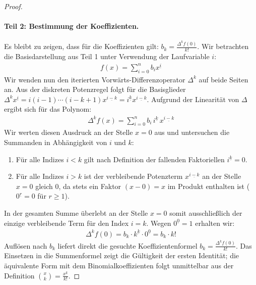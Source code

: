 \documentclass{article}
\theoremstyle{definition}
\begin{document}
\begin{proof}
\paragraph{Teil 2: Bestimmung der Koeffizienten.}
Es bleibt zu zeigen, dass für die Koeffizienten gilt: $b_k = \frac{\Delta^k f(0)}{k!}$.
Wir betrachten die Basisdarstellung aus Teil 1 unter Verwendung der Laufvariable $i$:
\begin{align*}
    f(x) = \sum_{i=0}^{n} b_i x^{\underline{i}}
\end{align*}
Wir wenden nun den iterierten Vorwärts-Differenzoperator $\Delta^k$ auf beide Seiten an. Aus der diskreten Potenzregel folgt für die Basisglieder $\Delta^k x^{\underline{i}} = i(i-1)\cdots(i-k+1)x^{\underline{i-k}} = i^{\underline{k}} x^{\underline{i-k}}$. Aufgrund der Linearität von $\Delta$ ergibt sich für das Polynom:
\begin{align*}
    \Delta^k f(x) = \sum_{i=0}^{n} b_i \, i^{\underline{k}}\, x^{\underline{i-k}}
\end{align*}
Wir werten diesen Ausdruck an der Stelle $x=0$ aus und untersuchen die Summanden in Abhängigkeit von $i$ und $k$:
\begin{enumerate}
    \item Für alle Indizes $i < k$ gilt nach Definition der fallenden Faktoriellen $i^{\underline{k}} = 0$.
    \item Für alle Indizes $i > k$ ist der verbleibende Potenzterm $x^{\underline{i-k}}$ an der Stelle $x=0$ gleich $0$, da stets ein Faktor $(x-0) = x$ im Produkt enthalten ist ($0^{\underline{r}} = 0$ für $r \ge 1$).
\end{enumerate}
In der gesamten Summe überlebt an der Stelle $x=0$ somit ausschließlich der einzige verbleibende Term für den Index $i = k$. Wegen $0^{\underline{0}} = 1$ erhalten wir:
\begin{align*}
    \Delta^k f(0) = b_k \cdot k^{\underline{k}} \cdot 0^{\underline{0}} = b_k \cdot k!
\end{align*}
Auflösen nach $b_k$ liefert direkt die gesuchte Koeffizientenformel $b_k = \frac{\Delta^k f(0)}{k!}$. Das Einsetzen in die Summenformel zeigt die Gültigkeit der ersten Identität; die äquivalente Form mit dem Binomialkoeffizienten folgt unmittelbar aus der Definition $\binom{x}{k} = \frac{x^{\underline{k}}}{k!}$.
\end{proof}
\end{document}
